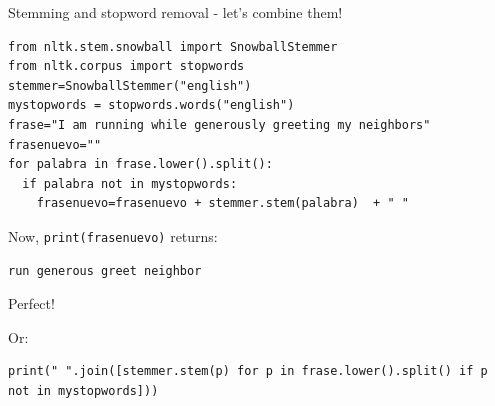 \documentclass{beamer}
\begin{document}
\begin{frame}[fragile]{Stemming and stopword removal - let's combine them!}
\begin{lstlisting}
from nltk.stem.snowball import SnowballStemmer
from nltk.corpus import stopwords
stemmer=SnowballStemmer("english")
mystopwords = stopwords.words("english")
frase="I am running while generously greeting my neighbors"
frasenuevo=""
for palabra in frase.lower().split():
  if palabra not in mystopwords:
    frasenuevo=frasenuevo + stemmer.stem(palabra)  + " "
\end{lstlisting}
Now, {\tt{print(frasenuevo)}} returns:
\begin{lstlisting}
run generous greet neighbor
\end{lstlisting}
Perfect!

\pause
\small
Or:
\begin{lstlisting}
print(" ".join([stemmer.stem(p) for p in frase.lower().split() if p not in mystopwords]))
\end{lstlisting}


\end{frame}

{
\begin{frame}[plain]
\end{frame}
}
\end{document}
